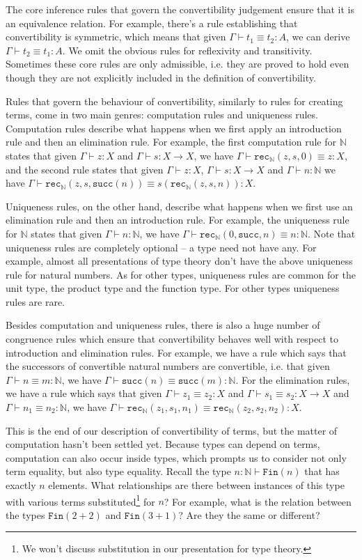 \documentclass[declaration,mgr,english,shortabstract]{iithesis}
\newcommand{\m}[1]{\texttt{#1}}
\newcommand{\type}[2]{#1 \vdash #2}
\newcommand{\term}[3]{#1 \vdash #2 : #3}
\newcommand{\termconv}[4]{#1 \vdash #2 \equiv #3 : #4}
\newcommand{\N}{\mathbb{N}}
\newcommand{\suc}[1]{\m{succ}(#1)}
\newcommand{\recN}[3]{\m{rec}_\N(#1, #2, #3)}
\newcommand{\Fin}[1]{\m{Fin}(#1)}
\begin{document}
The core inference rules that govern the convertibility judgement ensure that it is an equivalence relation. For example, there's a rule establishing that convertibility is symmetric, which means that given $\termconv{\Gamma}{t_1}{t_2}{A}$, we can derive $\termconv{\Gamma}{t_2}{t_1}{A}$. We omit the obvious rules for reflexivity and transitivity. Sometimes these core rules are only admissible, i.e. they are proved to hold even though they are not explicitly included in the definition of convertibility.

Rules that govern the behaviour of convertibility, similarly to rules for creating terms, come in two main genres: computation rules and uniqueness rules. Computation rules describe what happens when we first apply an introduction rule and then an elimination rule. For example, the first computation rule for $\N$ states that given $\term{\Gamma}{z}{X}$ and $\term{\Gamma}{s}{X \to X}$, we have $\termconv{\Gamma}{\recN{z}{s}{0}}{z}{X}$, and the second rule states that given $\term{\Gamma}{z}{X}$, $\term{\Gamma}{s}{X \to X}$ and $\term{\Gamma}{n}{\N}$ we have $\termconv{\Gamma}{\recN{z}{s}{\suc{n}}}{s(\recN{z}{s}{n})}{X}$.

Uniqueness rules, on the other hand, describe what happens when we first use an elimination rule and then an introduction rule. For example, the uniqueness rule for $\N$ states that given $\term{\Gamma}{n}{\N}$, we have $\termconv{\Gamma}{\recN{0}{\m{succ}}{n}}{n}{\N}$. Note that uniqueness rules are completely optional -- a type need not have any. For example, almost all presentations of type theory don't have the above uniqueness rule for natural numbers. As for other types, uniqueness rules are common for the unit type, the product type and the function type. For other types uniqueness rules are rare.

Besides computation and uniqueness rules, there is also a huge number of congruence rules which ensure that convertibility behaves well with respect to introduction and elimination rules. For example, we have a rule which says that the successors of convertible natural numbers are convertible, i.e. that given $\termconv{\Gamma}{n}{m}{\N}$, we have $\termconv{\Gamma}{\suc{n}}{\suc{m}}{\N}$. For the elimination rules, we have a rule which says that given $\termconv{\Gamma}{z_1}{z_2}{X}$ and $\termconv{\Gamma}{s_1}{s_2}{X \to X}$ and $\termconv{\Gamma}{n_1}{n_2}{\N}$, we have $\termconv{\Gamma}{\recN{z_1}{s_1}{n_1}}{\recN{z_2}{s_2}{n_2}}{X}$.

This is the end of our description of convertibility of terms, but the matter of computation hasn't been settled yet. Because types can depend on terms, computation can also occur inside types, which prompts us to consider not only term equality, but also type equality. Recall the type $\type{n : \N}{\Fin{n}}$ that has exactly $n$ elements. What relationships are there between instances of this type with various terms substituted\footnote{We won't discuss substitution in our presentation for type theory.} for $n$? For example, what is the relation between the types $\Fin{2 + 2}$ and $\Fin{3 + 1}$? Are they the same or different?
\end{document}
